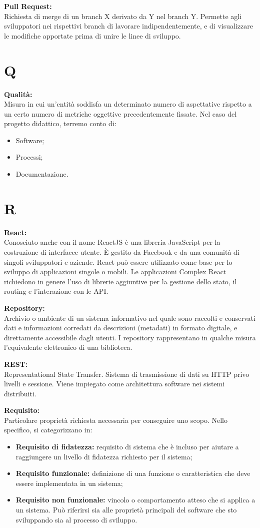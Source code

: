 \documentclass[a4paper, oneside, openany, dvipsnames, table]{article}
\begin{document}
\textbf{Pull Request:}\\	Richiesta di merge di un branch X derivato da Y nel branch Y. Permette agli sviluppatori nei rispettivi branch di lavorare indipendentemente, e di visualizzare le modifiche apportate prima di unire le linee di sviluppo.

\newpage
\section{Q}
\textbf{Qualità:}\\	Misura in cui un'entità soddisfa un determinato numero di aspettative rispetto a un certo numero di metriche oggettive precedentemente fissate. Nel caso del progetto didattico, terremo conto di:
\begin{itemize}
	\item Software;
	\item Processi;
	\item Documentazione.
\end{itemize}


\newpage
\section{R}
\textbf{React:}\\	Conosciuto anche con il nome ReactJS è una libreria JavaScript per la costruzione di interfacce utente. È gestito da Facebook e da una comunità di singoli sviluppatori e aziende. React può essere utilizzato come base per lo sviluppo di applicazioni singole o mobili. Le applicazioni Complex React richiedono in genere l'uso di librerie aggiuntive per la gestione dello stato, il routing e l'interazione con le API.
 
\textbf{Repository:}\\	Archivio o ambiente di un sistema informativo nel quale sono raccolti e conservati dati e informazioni corredati da descrizioni (metadati) in formato digitale, e direttamente accessibile dagli utenti. I repository rappresentano in qualche misura l’equivalente elettronico di una biblioteca.

\textbf{REST:}\\
Representational State Transfer. Sistema di trasmissione di dati su HTTP privo livelli e sessione. Viene impiegato come architettura software nei sistemi distribuiti.

\textbf{Requisito:}\\	Particolare proprietà richiesta necessaria per conseguire uno scopo. Nello specifico, si categorizzano in:
\begin{itemize}
	\item \textbf{Requisito di fidatezza:} requisito di sistema che è incluso per aiutare a raggiungere un livello di fidatezza richiesto per il sistema;
	\item \textbf{Requisito funzionale:} definizione di una funzione o caratteristica che deve essere implementata in un sistema;
	\item \textbf{Requisito non funzionale:} vincolo o comportamento atteso che si applica a un sistema. Può riferirsi sia alle proprietà principali del software che sto sviluppando sia al processo di sviluppo.
\end{itemize}
\end{document}
